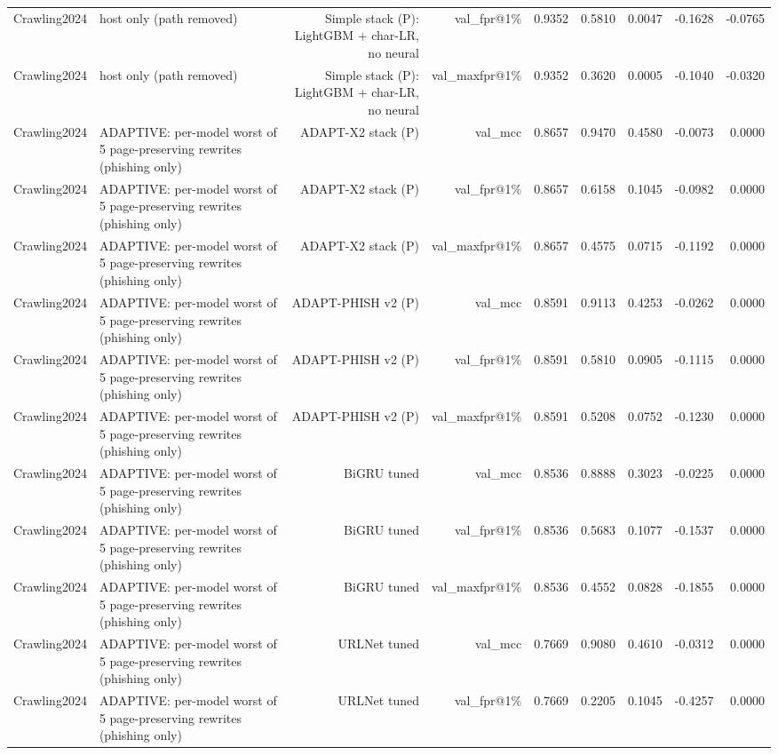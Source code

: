 \begin{table}[t]
\begin{tabular}{llrrrrrrr}
Crawling2024 & host only (path removed) & Simple stack (P): LightGBM + char-LR, no neural & val\_fpr@1\% & 0.9352 & 0.5810 & 0.0047 & -0.1628 & -0.0765 \\
Crawling2024 & host only (path removed) & Simple stack (P): LightGBM + char-LR, no neural & val\_maxfpr@1\% & 0.9352 & 0.3620 & 0.0005 & -0.1040 & -0.0320 \\
Crawling2024 & ADAPTIVE: per-model worst of 5 page-preserving rewrites (phishing only) & ADAPT-X2 stack (P) & val\_mcc & 0.8657 & 0.9470 & 0.4580 & -0.0073 & 0.0000 \\
Crawling2024 & ADAPTIVE: per-model worst of 5 page-preserving rewrites (phishing only) & ADAPT-X2 stack (P) & val\_fpr@1\% & 0.8657 & 0.6158 & 0.1045 & -0.0982 & 0.0000 \\
Crawling2024 & ADAPTIVE: per-model worst of 5 page-preserving rewrites (phishing only) & ADAPT-X2 stack (P) & val\_maxfpr@1\% & 0.8657 & 0.4575 & 0.0715 & -0.1192 & 0.0000 \\
Crawling2024 & ADAPTIVE: per-model worst of 5 page-preserving rewrites (phishing only) & ADAPT-PHISH v2 (P) & val\_mcc & 0.8591 & 0.9113 & 0.4253 & -0.0262 & 0.0000 \\
Crawling2024 & ADAPTIVE: per-model worst of 5 page-preserving rewrites (phishing only) & ADAPT-PHISH v2 (P) & val\_fpr@1\% & 0.8591 & 0.5810 & 0.0905 & -0.1115 & 0.0000 \\
Crawling2024 & ADAPTIVE: per-model worst of 5 page-preserving rewrites (phishing only) & ADAPT-PHISH v2 (P) & val\_maxfpr@1\% & 0.8591 & 0.5208 & 0.0752 & -0.1230 & 0.0000 \\
Crawling2024 & ADAPTIVE: per-model worst of 5 page-preserving rewrites (phishing only) & BiGRU tuned & val\_mcc & 0.8536 & 0.8888 & 0.3023 & -0.0225 & 0.0000 \\
Crawling2024 & ADAPTIVE: per-model worst of 5 page-preserving rewrites (phishing only) & BiGRU tuned & val\_fpr@1\% & 0.8536 & 0.5683 & 0.1077 & -0.1537 & 0.0000 \\
Crawling2024 & ADAPTIVE: per-model worst of 5 page-preserving rewrites (phishing only) & BiGRU tuned & val\_maxfpr@1\% & 0.8536 & 0.4552 & 0.0828 & -0.1855 & 0.0000 \\
Crawling2024 & ADAPTIVE: per-model worst of 5 page-preserving rewrites (phishing only) & URLNet tuned & val\_mcc & 0.7669 & 0.9080 & 0.4610 & -0.0312 & 0.0000 \\
Crawling2024 & ADAPTIVE: per-model worst of 5 page-preserving rewrites (phishing only) & URLNet tuned & val\_fpr@1\% & 0.7669 & 0.2205 & 0.1045 & -0.4257 & 0.0000 \\

\end{tabular}
\end{table}
